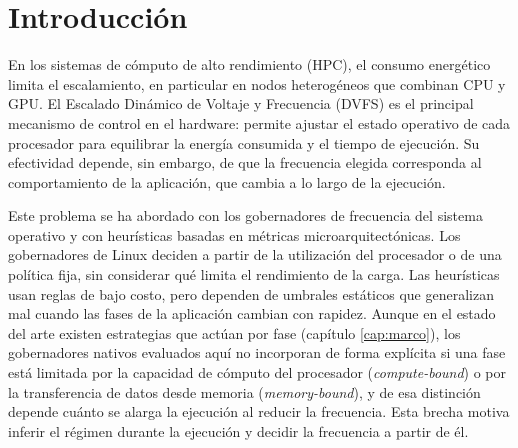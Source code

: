 \clearpage
{\singlespacing
\setcounter{tocdepth}{2}
\setlength{\parskip}{0pt}
\renewcommand{\baselinestretch}{0.95}\selectfont
\tableofcontents}


\clearpage
{\singlespacing
\listoftables}


\clearpage
{\singlespacing
\listoffigures}


\chapter*{Introducción}
\setcounter{chapter}{0}
\setcounter{equation}{0}
\setcounter{figure}{0}
\setcounter{table}{0}

En los sistemas de cómputo de alto rendimiento (HPC), el consumo energético limita el escalamiento, en particular en nodos heterogéneos que combinan CPU y GPU. El Escalado Dinámico de Voltaje y Frecuencia (DVFS) es el principal mecanismo de control en el hardware: permite ajustar el estado operativo de cada procesador para equilibrar la energía consumida y el tiempo de ejecución. Su efectividad depende, sin embargo, de que la frecuencia elegida corresponda al comportamiento de la aplicación, que cambia a lo largo de la ejecución.

Este problema se ha abordado con los gobernadores de frecuencia del sistema operativo y con heurísticas basadas en métricas microarquitectónicas. Los gobernadores de Linux deciden a partir de la utilización del procesador o de una política fija, sin considerar qué limita el rendimiento de la carga. Las heurísticas usan reglas de bajo costo, pero dependen de umbrales estáticos que generalizan mal cuando las fases de la aplicación cambian con rapidez. Aunque en el estado del arte existen estrategias que actúan por fase (capítulo \ref{cap:marco}), los gobernadores nativos evaluados aquí no incorporan de forma explícita si una fase está limitada por la capacidad de cómputo del procesador (\textit{compute-bound}) o por la transferencia de datos desde memoria (\textit{memory-bound}), y de esa distinción depende cuánto se alarga la ejecución al reducir la frecuencia. Esta brecha motiva inferir el régimen durante la ejecución y decidir la frecuencia a partir de él.

